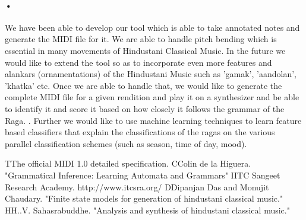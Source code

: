 \documentclass[12pt,a4paper]{article}
\begin{document}
\paragraph{•}
We have been able to develop our tool which is able to take annotated notes and generate the MIDI file for it. We are able to handle pitch bending which is essential in many movements of Hindustani Classical Music. In the future we would like to extend the tool so as to incorporate even more features and alankars (ornamentations) of the Hindustani Music such as 'gamak', 'aandolan', 'khatka' etc. Once we are able to handle that, we would like to generate the complete MIDI file for a given rendition and play it on a synthesizer and be able to identify it and score it based on how closely it follows the grammar of the Raga.
. Further we would like to use machine learning techniques to learn feature based classifiers that explain the classifications of the ragas on the various parallel classification schemes (such as season, time of day, mood).
\pagebreak
\newpage
\begin{thebibliography}{99}
\nocite{*}
\bibitem[1] TThe official MIDI 1.0 detailed specification.
\bibitem[2] CColin de la Higuera. "Grammatical Inference: Learning Automata and Grammars"
\bibitem[3]IITC Sangeet Research Academy. http://www.itcsra.org/
\bibitem[4]DDipanjan Das and Monujit Chaudary. "Finite state models for generation of hindustani classical music."
\bibitem[5]HH..V. Sahasrabuddhe. "Analysis and synthesis of hindustani classical music."
\nocite{*}
\end{thebibliography}
\end{document}
